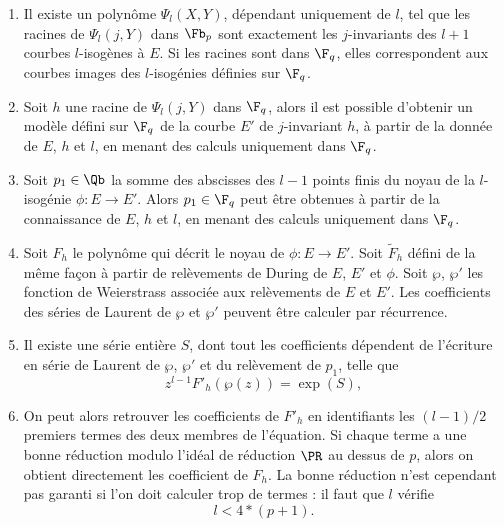 \begin{enumerate}
	
	\item Il existe un polynôme $\Psi_{l}(X,Y)$, dépendant uniquement de $l$, tel que les racines de $\Psi_{l}(j,Y)$ dans $\Fb_{p}$ sont exactement les $j$-invariants des $l+1$ courbes $l$-isogènes à $E$. Si les racines sont dans $\F_{q}$, elles correspondent aux courbes images des $l$-isogénies définies sur $\F_{q}$.
	
	\item Soit $h$ une racine de $\Psi_{l}(j,Y)$ dans $\F_{q}$, alors il est possible d'obtenir un modèle défini sur $\F_{q}$ de la courbe $E'$ de $j$-invariant $h$, à partir de la donnée de $E$, $h$ et $l$, en menant des calculs uniquement dans $\F_{q}$.
	
	\item  Soit $p_{1}\in\Qb$ la somme des abscisses des $l-1$ points finis du noyau de la $l$-isogénie $\phi : E\rightarrow E'$. Alors $p_{1}\in\F_{q}$ peut être obtenues à partir de la connaissance de $E$, $h$ et $l$, en menant des calculs uniquement dans $\F_{q}$.
	
	\item Soit $F_{h}$ le polynôme qui décrit le noyau de $\phi : E\rightarrow E'$. Soit $\tilde{F}_{h}$ défini de la même façon à partir de relèvements de During de $E$, $E'$ et $\phi$. Soit $\wp$, $\wp'$ les fonction de Weierstrass associée aux relèvements de $E$ et $E'$. Les coefficients des séries de Laurent de $\wp$ et $\wp'$ peuvent être calculer par récurrence.
	
	\item Il existe une série entière $S$, dont tout les coefficients dépendent de l'écriture en série de Laurent de $\wp$, $\wp'$ et du relèvement de $p_{1}$, telle que
	\begin{equation}
		z^{l-1}F'_{h}(\wp(z)) = \exp(S),
	\end{equation}
	
	\item On peut alors retrouver les coefficients de $F'_{h}$ en identifiants les $(l-1)/2$ premiers termes des deux membres de l'équation. Si chaque terme a une bonne réduction modulo l'idéal de réduction $\PR$ au dessus de $p$, alors on obtient directement les coefficient de $F_{h}$. La bonne réduction n'est cependant pas garanti si l'on doit calculer trop de termes : il faut que $l$ vérifie
	\begin{equation*}
		l < 4*(p+1).
	\end{equation*}
\end{enumerate}

